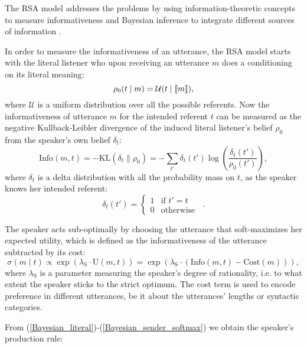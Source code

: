 The RSA model addresses the problems by using information-theoretic concepts to measure informativeness and Bayesian inference to integrate different sources of information \cite{Frank}. 

In order to measure the informativeness of an utterance, the RSA model starts with the literal listener who upon receiving an utterance $m$ does a conditioning on its literal meaning:
\begin{equation}\label{Bayesian_literal}
\rho_0(t \mid m) = \mathcal{U}(t\mid \llbracket m \rrbracket) ,
\end{equation}
where $\mathcal{U}$ is a uniform distribution over all the possible referents. Now the informativeness of utterance $m$ for the intended referent $t$ can be measured as the negative Kullback-Leibler divergence of the induced literal listener's belief $\rho_0$ from the speaker's own belief $\delta_t$:
\begin{equation} \label{Bayesian_sender_informativeness}
\mbox{Info}(m,t)=-\mbox{KL}(\delta_t \| \rho_0)=-\sum_{t'}\delta_t(t')\log\left(\frac{\delta_t(t')}{\rho_0(t')}\right),
\end{equation}
where $\delta_t$ is a delta distribution with all the probability mass on $t$, as the speaker knows her intended referent:
\begin{equation} \label{Bayesian_sender_delta}
\delta_t(t')=\left\{ \begin{array}{ll}
1 & \mbox{if } t' = t \\
0 & \mbox{otherwise}
\end{array}\right. \enspace .
\end{equation}


The speaker acts sub-optimally by choosing the utterance that soft-maximizes her expected utility, which is defined as the informativeness of the utterance subtracted by its cost:
\begin{equation} \label{Bayesian_sender_softmax}
\sigma(m \mid t) \propto \exp(\lambda_\mathrm{S}\cdot \mbox{U}(m,t))=\exp(\lambda_\mathrm{S} \cdot (\mbox{Info}(m,t)-\mbox{Cost}(m))),
\end{equation}
where $\lambda_\mathrm{S}$ is a parameter measuring the speaker's degree of rationality, i.e. to what extent the speaker sticks to the strict optimum. The cost term is used to encode preference in different utterances, be it about the utterances' lengths or syntactic categories. 

From (\ref{Bayesian_literal})-(\ref{Bayesian_sender_softmax}) we obtain the speaker's production rule:

